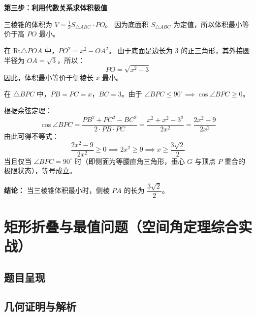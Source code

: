 \documentclass[11pt,a4paper]{ctexart}
\begin{document}
\begin{proof*}
\vspace{0.3cm}
\textbf{第三步：利用代数关系求体积极值}\par
三棱锥的体积为 $V = \frac{1}{3} S_{\triangle ABC} \cdot PO$。
因为底面积 $S_{\triangle ABC}$ 为定值，所以体积最小等价于高 $PO$ 最小。\par
在 Rt$\triangle POA$ 中，$PO^2 = x^2 - OA^2$。
由于底面是边长为 3 的正三角形，其外接圆半径为 $OA = \sqrt{3}$，所以：
\[ PO = \sqrt{x^2 - 3} \]
因此，体积最小等价于侧棱长 $x$ 最小。\par
在 $\triangle BPC$ 中，$PB = PC = x$，$BC = 3$。由于 $\angle BPC \le 90^\circ \implies \cos\angle BPC \ge 0$。\par
根据余弦定理：
\[ \cos\angle BPC = \frac{PB^2 + PC^2 - BC^2}{2 \cdot PB \cdot PC} = \frac{x^2 + x^2 - 3^2}{2x^2} = \frac{2x^2 - 9}{2x^2} \]
由此可得不等式：
\[ \frac{2x^2 - 9}{2x^2} \ge 0 \implies 2x^2 \ge 9 \implies x \ge \frac{3\sqrt{2}}{2} \]
当且仅当 $\angle BPC = 90^\circ$ 时（即侧面为等腰直角三角形，垂心 $G$ 与顶点 $P$ 重合的极限状态），等号成立。

\vspace{0.2cm}
\noindent\textbf{结论：} 当三棱锥体积最小时，侧棱 $PA$ 的长为 $\dfrac{3\sqrt{2}}{2}$。
\end{proof*}

\newpage
\section{矩形折叠与最值问题（空间角定理综合实战）}

\subsection{题目呈现}
\qSolidFoldingRectangleStem

\begin{center}
  \qSolidFoldingRectangleFigure[1.3]
\end{center}

\subsection{几何证明与解析}
\qSolidFoldingRectangleSolution
\end{document}
